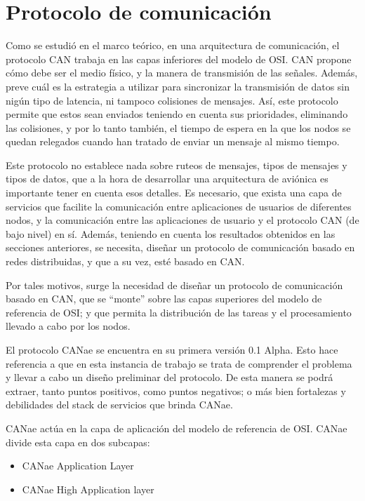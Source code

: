 \section{Protocolo de comunicación}
Como se estudió en el marco teórico, en una arquitectura
de comunicación, el protocolo CAN trabaja en las
capas inferiores del modelo de OSI. CAN propone cómo debe ser
el medio físico, y la manera de transmisión de las señales.
Además, preve cuál es la estrategia a utilizar  para sincronizar
la transmisión de datos sin nigún tipo de latencia, ni tampoco
colisiones de mensajes. Así, este protocolo permite que estos
sean enviados teniendo en cuenta sus prioridades, eliminando las colisiones, y
por lo tanto también, el tiempo de espera en la que los nodos se quedan
relegados cuando han tratado de enviar un mensaje al mismo tiempo.

Este protocolo no establece nada sobre ruteos de mensajes, tipos de mensajes y
tipos de datos, que a la hora de desarrollar una arquitectura de aviónica es
importante tener en cuenta esos detalles. Es necesario, que exista una
capa de servicios que facilite la comunicación entre aplicaciones de usuarios
de diferentes nodos, y la comunicación entre las aplicaciones de usuario
y el protocolo CAN (de bajo nivel) en sí.
Además, teniendo en cuenta los resultados obtenidos en las secciones
anteriores, se necesita, diseñar un protocolo de comunicación
basado en redes distribuidas, y que a su vez, esté basado en CAN.

Por tales motivos, surge la necesidad
de diseñar un protocolo de comunicación basado en CAN, que se ``monte'' sobre
las capas superiores del modelo de referencia de OSI; y que permita
la distribución de las tareas y el procesamiento llevado a cabo
por los nodos. 

El protocolo CANae se encuentra en su primera versión 0.1 Alpha. Esto hace
referencia a que en esta instancia de trabajo se trata de comprender
el problema y llevar a cabo un diseño preliminar del protocolo. De esta
manera se podrá extraer, tanto puntos positivos, como puntos negativos; o
más bien fortalezas y debilidades del stack de servicios que brinda CANae.

CANae actúa en la capa de aplicación del modelo de referencia de OSI. CANae
divide esta capa en dos subcapas:
\begin{itemize}
\item CANae Application Layer
\item CANae High Application layer
\end{itemize}

